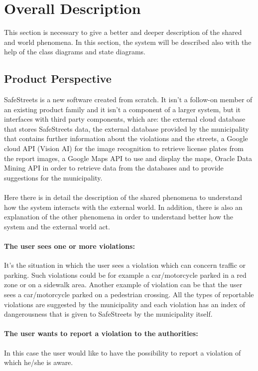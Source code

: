 \documentclass[titlepage]{article}
\begin{document}
\section{Overall Description}
This section is necessary to give a better and deeper description of the shared and world phenomena. In this section, the system will be described also with the help of the class diagrams and state diagrams.
\subsection{Product Perspective}

SafeStreets is a new software created from scratch. It isn't a follow-on member of an existing product family and it isn't a component of a larger system, but it interfaces with third party components, which are: the external cloud database that stores SafeStreets data, the external database provided by the municipality that contains further information about the violations and the streets, a Google cloud API (Vision AI) for the image recognition to retrieve license plates from the report images, a Google Maps API to use and display the maps, Oracle Data Mining API in order to retrieve data from the databases and to provide suggestions for the municipality.\\ \\

Here there is in detail the description of the shared phenomena to understand how the system interacts with the external world. In addition, there is also an explanation of the other phenomena in order to understand better how the system and the external world act. \\

\paragraph{The user sees one or more violations:}
It's the situation in which the user sees a violation which can concern traffic or parking. Such violations could be for example a car/motorcycle parked in a red zone or on a sidewalk area. Another example of violation can be that the user sees a car/motorcycle parked on a pedestrian crossing. All the types of reportable violations are suggested by the municipality and each violation has an index of dangerousness that is given to SafeStreets by the municipality itself.
\paragraph{The user wants to report a violation to the 					  authorities:}
In this case the user would like to have the possibility to report a violation of which he/she is aware. 
\end{document}
